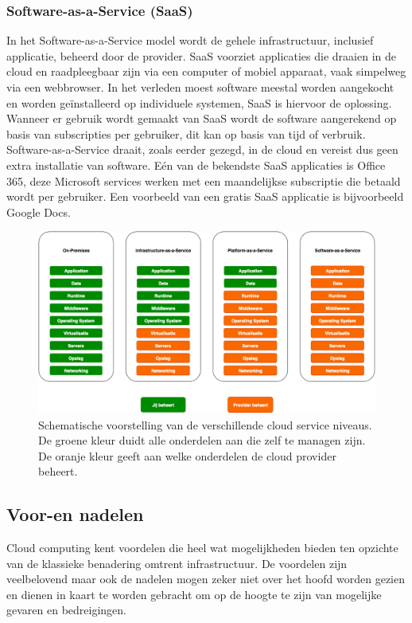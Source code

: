 \subsubsection{Software-as-a-Service (SaaS)}
In het Software-as-a-Service model wordt de gehele infrastructuur, inclusief applicatie, beheerd door de provider. SaaS voorziet applicaties die draaien in de cloud en raadpleegbaar zijn via een computer of mobiel apparaat, vaak simpelweg via een webbrowser. In het verleden moest software meestal worden aangekocht en worden geïnstalleerd op individuele systemen, SaaS is hiervoor de oplossing. Wanneer er gebruik wordt gemaakt van SaaS wordt de software aangerekend op basis van subscripties per gebruiker, dit kan op basis van tijd of verbruik. Software-as-a-Service draait, zoals eerder gezegd, in de cloud en vereist dus geen extra installatie van software. Eén van de bekendste SaaS applicaties is Office 365, deze Microsoft services werken met een maandelijkse subscriptie die betaald wordt per gebruiker. Een voorbeeld van een gratis SaaS applicatie is bijvoorbeeld Google Docs. \autocite{Goyal2014}
\begin{figure}
    \includegraphics[width=1\textwidth]{img/cloud_service_level.png}
    \caption{Schematische voorstelling van de verschillende cloud service niveaus. De groene kleur duidt alle onderdelen aan die zelf te managen zijn. De oranje kleur geeft aan welke onderdelen de cloud provider beheert.} 
    \label{fig:cloud-service-levels}  
\end{figure}
\newline

\subsection{Voor-en nadelen}
\label{voor-en-nadelen}
Cloud computing kent voordelen die heel wat mogelijkheden bieden ten opzichte van de klassieke benadering omtrent infrastructuur. \autocite{Azure2019} De voordelen zijn veelbelovend maar ook de nadelen mogen zeker niet over het hoofd worden gezien en dienen in kaart te worden gebracht om op de hoogte te zijn van mogelijke gevaren en bedreigingen. \autocite{Sosinsky2011} 

